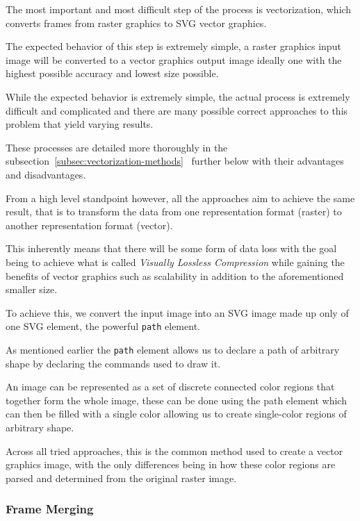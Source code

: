 \documentclass[12pt]{article}
\newcommand{\sentence}{} %
\newcommand{\italic}[1]{\textit{#1}}
\newcommand{\code}[1]{\texttt{#1}}
\newcommand{\fullref}[1]{\ref{#1}~\nameref{#1}}
\begin{document}
    \tab
    The most important and most difficult step of the process is vectorization, which converts
    frames from raster graphics to SVG vector graphics.
    \sentence
    The expected behavior of this step is extremely simple, a raster graphics input image will be converted to a
    vector graphics output image ideally one with the highest possible accuracy and lowest size possible.
    \sentence
    While the expected behavior is extremely simple, the actual process is extremely difficult and complicated and
    there are many possible correct approaches to this problem that yield varying results.
    \sentence
    These processes are detailed more thoroughly in the subsection~\fullref{subsec:vectorization-methods} further below
    with their advantages and disadvantages.
    \sentence
    From a high level standpoint however, all the approaches aim to achieve the same result, that is to transform the
    data from one representation format (raster) to another representation format (vector).
    \sentence
    This inherently means that there will be some form of data loss with the goal being to achieve what is called
    \italic{Visually Lossless Compression} while gaining the benefits of vector graphics such as scalability in
    addition to the aforementioned smaller size.
    \sentence
    To achieve this, we convert the input image into an SVG image made up only of one SVG element, the powerful
    \code{path} element.
    \sentence
    As mentioned earlier the \code{path} element allows us to declare a path of arbitrary shape by declaring the
    commands used to draw it.
    \sentence
    An image can be represented as a set of discrete connected color regions that together form the whole image,
    these can be done using the path element which can then be filled with a single color allowing us to create
    single-color regions of arbitrary shape.
    \sentence
    Across all tried approaches, this is the common method used to create a vector graphics image, with the only
    differences being in how these color regions are parsed and determined from the original raster image.


    \subsubsection{Frame Merging}\label{subsubsec:frame-merging}
\end{document}
